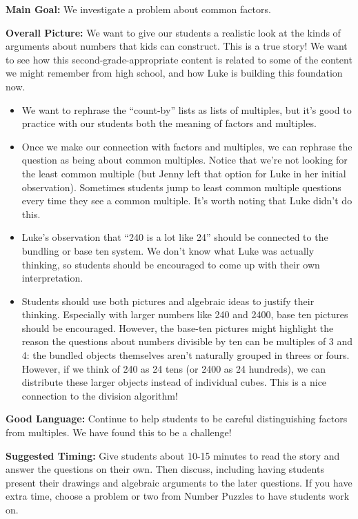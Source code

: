 \documentclass[nooutcomes,noauthor,handout]{ximera}
\begin{document}
\newpage
\begin{instructorNotes}

{\bf Main Goal:} We investigate a problem about common factors.


{\bf Overall Picture:} We want to give our students a realistic look at the kinds of arguments about numbers that kids can construct. This is a true story! We want to see how this second-grade-appropriate content is related to some of the content we might remember from high school, and how Luke is building this foundation now.

\begin{itemize}
\item We want to rephrase the ``count-by'' lists as lists of multiples, but it’s good to practice with our students both the meaning of factors and multiples.
\item Once we make our connection with factors and multiples, we can rephrase the question as being about common multiples. Notice that we’re not looking for the least common multiple (but Jenny left that option for Luke in her initial observation). Sometimes students jump to least common multiple questions every time they see a common multiple. It’s worth noting that Luke didn’t do this.
\item Luke’s observation that ``240 is a lot like 24'' should be connected to the bundling or base ten system. We don’t know what Luke was actually thinking, so students should be encouraged to come up with their own interpretation. 
\item Students should use both pictures and algebraic ideas to justify their thinking. Especially with larger numbers like 240 and 2400, base ten pictures should be encouraged. However, the base-ten pictures might highlight the reason the questions about numbers divisible by ten can be multiples of 3 and 4: the bundled objects themselves aren’t naturally grouped in threes or fours. However, if we think of 240 as 24 tens (or 2400 as 24 hundreds), we can distribute these larger objects instead of individual cubes. This is a nice connection to the division algorithm!

\end{itemize}




{\bf Good Language:} Continue to help students to be careful distinguishing factors from multiples. We have found this to be a challenge!



{\bf Suggested Timing:} Give students about 10-15 minutes to read the story and answer the questions on their own. Then discuss, including having students present their drawings and algebraic arguments to the later questions. If you have extra time, choose a problem or two from Number Puzzles to have students work on.

\end{instructorNotes}
\end{document}
